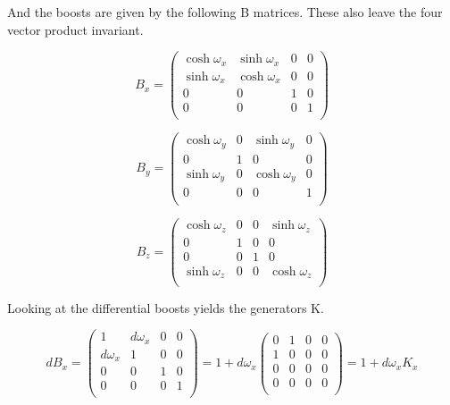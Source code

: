 And the boosts are given by the following B matrices. These also leave the four vector product invariant.

\begin{equation}
B_x = 
\begin{pmatrix}
\cosh\omega_x & \sinh\omega_x & 0 & 0 \\
\sinh\omega_x & \cosh\omega_x & 0 & 0 \\
0 & 0 & 1 & 0 \\
0 & 0 & 0 & 1 \\
\end{pmatrix}
\end{equation}

\begin{equation}
B_y = 
\begin{pmatrix}
\cosh\omega_y & 0 & \sinh\omega_y & 0 \\
0 & 1 & 0 & 0 \\
\sinh\omega_y & 0 & \cosh\omega_y & 0 \\
0 & 0 & 0 & 1 \\
\end{pmatrix}
\end{equation}

\begin{equation}
B_z = 
\begin{pmatrix}
\cosh\omega_z & 0 & 0 & \sinh\omega_z \\
0 & 1 & 0 & 0 \\
0 & 0 & 1 & 0 \\
\sinh\omega_z & 0 & 0 & \cosh\omega_z \\
\end{pmatrix}
\end{equation}

Looking at the differential boosts yields the generators K.

\begin{equation}
dB_x = 
\begin{pmatrix}
1 & d\omega_x & 0 & 0 \\
d\omega_x & 1 & 0 & 0 \\
0 & 0 & 1 & 0 \\
0 & 0 & 0 & 1 \\
\end{pmatrix}
= 1 + d\omega_x 
\begin{pmatrix}
0 & 1 & 0 & 0 \\
1 & 0 & 0 & 0 \\
0 & 0 & 0 & 0 \\
0 & 0 & 0 & 0 \\
\end{pmatrix}
= 1 + d\omega_x K_x
\end{equation}


